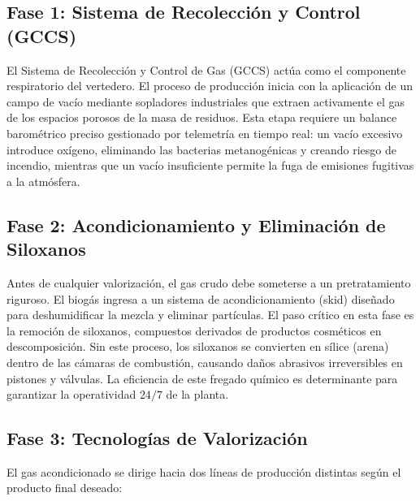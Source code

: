 \documentclass[11pt,letterpaper]{article}
\begin{document}
\subsection{Fase 1: Sistema de Recolección y Control (GCCS)}

El Sistema de Recolección y Control de Gas (GCCS) actúa como el componente
respiratorio del vertedero. El proceso de producción inicia con la aplicación de
un campo de vacío mediante sopladores industriales que extraen activamente el
gas de los espacios porosos de la masa de residuos. Esta etapa requiere un
balance barométrico preciso gestionado por telemetría en tiempo real: un vacío
excesivo introduce oxígeno, eliminando las bacterias metanogénicas y creando
riesgo de incendio, mientras que un vacío insuficiente permite la fuga de
emisiones fugitivas a la atmósfera.

\subsection{Fase 2: Acondicionamiento y Eliminación de Siloxanos}

Antes de cualquier valorización, el gas crudo debe someterse a un pretratamiento
riguroso. El biogás ingresa a un sistema de acondicionamiento (skid) diseñado
para deshumidificar la mezcla y eliminar partículas. El paso crítico en esta
fase es la remoción de siloxanos, compuestos derivados de productos cosméticos
en descomposición. Sin este proceso, los siloxanos se convierten en sílice
(arena) dentro de las cámaras de combustión, causando daños abrasivos
irreversibles en pistones y válvulas. La eficiencia de este fregado químico es
determinante para garantizar la operatividad $24/7$ de la planta.

\subsection{Fase 3: Tecnologías de Valorización}

El gas acondicionado se dirige hacia dos líneas de producción distintas según el
producto final deseado:
\end{document}
